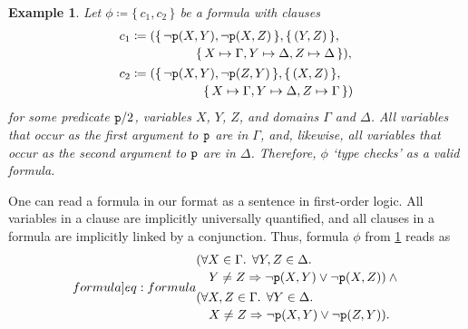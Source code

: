 \documentclass{article}
\newtheorem{example}{Example}
\newcommand{\predicate}{\texttt{\textup{p}}}
\begin{document}
\begin{example}\label{example:first}
  Let $\phi \coloneqq \{\, c_1, c_2 \,\}$ be a formula with clauses
  \begin{align*}
    c_1 &\coloneqq
          \begin{multlined}[t]
            (\{\, \neg \predicate(X, Y), \neg \predicate(X, Z) \,\}, \{\, (Y, Z) \,\}, \\
            \{\, X \mapsto \Gamma, Y \mapsto \Delta, Z \mapsto \Delta \,\}),
          \end{multlined}\\
    c_2 &\coloneqq
          \begin{multlined}[t]
            (\{\, \neg \predicate(X, Y), \neg \predicate(Z, Y) \,\}, \{\, (X, Z) \,\}, \\
            \{\, X \mapsto \Gamma, Y \mapsto \Delta, Z \mapsto \Gamma \,\})
          \end{multlined}
  \end{align*}
  for some predicate $\predicate/2$, variables $X$, $Y$, $Z$, and domains
  $\Gamma$ and $\Delta$. All variables that occur as the first argument to
  $\predicate$ are in $\Gamma$, and, likewise, all variables that occur as the
  second argument to $\predicate$ are in $\Delta$. Therefore, $\phi$ `type
  checks' as a valid formula.
\end{example}

One can read a formula in our format as a sentence in first-order logic. All
variables in a clause are implicitly universally quantified, and all clauses in
a formula are implicitly linked by a conjunction. Thus, formula $\phi$ from
\cref{example:first} reads as
\begin{equation}\label[formula]{eq:formula}
  \begin{split}
    &\begin{multlined}[t]
      (\forall X \in \Gamma\text{. }\forall Y, Z \in \Delta\text{. }\\
      Y \ne Z \Rightarrow \neg \predicate(X, Y) \lor \neg \predicate(X, Z)) \land{}
    \end{multlined}\\
    &\begin{multlined}[t]
      (\forall X, Z \in \Gamma\text{. }\forall Y \in \Delta\text{. }\\
      X \ne Z \Rightarrow \neg \predicate(X, Y) \lor \neg \predicate(Z, Y)).
    \end{multlined}
  \end{split}
\end{equation}
\end{document}
